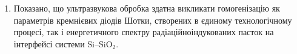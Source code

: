 \begin{enumerate}
\item Показано, що ультразвукова обробка здатна викликати гомогенізацію як параметрів кремнієвих діодів Шотки, створених в єдиному технологічному процесі, так і енергетичного спектру радіаційноіндукованих пасток 
    на інтерфейсі системи    Si--SiO$_2$.

\end{enumerate}

